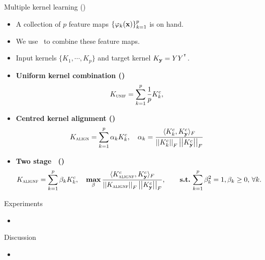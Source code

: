 \documentclass[first=dgreen,second=purple,logo=yellowexc]{aaltoslides}
\begin{document}
\begin{frame}{Multiple kernel learning (\mkl)}
	\begin{itemize}
		\item A collection of $p$ feature maps $\{\varphi_k(\mathbf {x})\}_{k=1}^p$ is on hand.
		\item We use \mkl\ to combine these feature maps.\\
		\item Input kernels $\{K_1,\cdots,K_p\}$ and target kernel $K_{\mathbf {y}} = YY^{^{\intercal}}$.
		\item {\bf Uniform kernel combination (\kunif)}
		\begin{align*}
		    K_{\text{{\sc unif}}}=\sum_{k=1}^{p}\frac{1}{p}K^c_k,
		\end{align*}
		\item {\bf Centred kernel alignment (\kalign)}
		\begin{align*}
			K_{\text{{\sc align}}}=\sum_{k=1}^{p}\alpha_kK^c_k,\quad \alpha_k = \frac{\langle K^c_k, K^{c}_{\mathbf {y}} \rangle_{F}}{\left|\left| K^c_k \right|\right|_F\left|\left| K_{\mathbf {y}}^{c} \right|\right|_F} 
		\end{align*}
		\item {\bf Two stage \mkl\ (\kalignf)}
		\begin{align*}
			K_{\text{{\sc alignf}}}=\sum_{k=1}^{p}\beta_k K^c_k, \quad
			\underset{\beta}{\textbf{max}}\, & \displaystyle \frac{\langle K_{\text{{\sc alignf}}}^c, K_{\mathbf {y}}^c \rangle_F}{\left|\left| K_{\text{{\sc alignf}}} \right|\right|_F\left|\left| K_{\mathbf {y}}^c \right|\right|_F},
		    \qquad \textbf{s.t.}\,  \displaystyle \sum_{k=1}^p\beta_k^2=1,  \beta_k\ge0,\,\forall k.
		\end{align*}
	\end{itemize}
\end{frame}

\begin{frame}{Experiments}
	\begin{itemize}
		\item 
	\end{itemize}
\end{frame}

\begin{frame}{Discussion}
	\begin{itemize}
		\item 
	\end{itemize}
\end{frame}


\iffalse
\begin{frame}[allowframebreaks]{Bibliography}
	
	
\end{frame}
\fi
\end{document}
